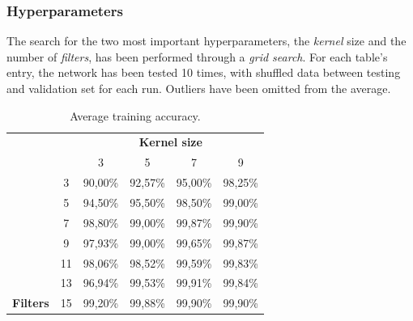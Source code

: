 \subsubsection{Hyperparameters}
The search for the two most important hyperparameters, the \textit{kernel} size and the number of \textit{filters}, has been performed through a \textit{grid search}. For each table's entry, the network has been tested 10 times, with shuffled data between testing and validation set for each run. Outliers have been omitted from the average.

\begin{table}[ht!]
	\centering
	\begin{tabular}{cccccc}
		&                                                 & \multicolumn{4}{c}{\textbf{Kernel size}} \\
		& \multicolumn{1}{c|}{}                           & 3                               & 5                               & 7                               & 9                               \\ \cline{2-6} 
		& \multicolumn{1}{c|}{3}                          & 90,00\%                         & 92,57\%                         & 95,00\%                         & 98,25\%                         \\
		& \multicolumn{1}{c|}{\cellcolor[HTML]{EFEFEF}5}  & \cellcolor[HTML]{EFEFEF}94,50\% & \cellcolor[HTML]{EFEFEF}95,50\% & \cellcolor[HTML]{EFEFEF}98,50\% & \cellcolor[HTML]{EFEFEF}99,00\% \\
		& \multicolumn{1}{c|}{7}                          & 98,80\%                         & 99,00\%                         & 99,87\%                         & 99,90\%                         \\
		& \multicolumn{1}{c|}{\cellcolor[HTML]{EFEFEF}9}  & \cellcolor[HTML]{EFEFEF}97,93\% & \cellcolor[HTML]{EFEFEF}99,00\% & \cellcolor[HTML]{EFEFEF}99,65\% & \cellcolor[HTML]{EFEFEF}99,87\% \\
		& \multicolumn{1}{c|}{11}                         & 98,06\%                         & 98,52\%                         & 99,59\%                         & 99,83\%                         \\
		& \multicolumn{1}{c|}{\cellcolor[HTML]{EFEFEF}13} & \cellcolor[HTML]{EFEFEF}96,94\% & \cellcolor[HTML]{EFEFEF}99,53\% & \cellcolor[HTML]{EFEFEF}99,91\% & \cellcolor[HTML]{EFEFEF}99,84\% \\
		\multirow{-7}{*}{\textbf{Filters}} & \multicolumn{1}{c|}{15}                         & 99,20\%                         & 99,88\%                         & 99,90\%                         & 99,90\%                        
	\end{tabular}
	\caption{Average training accuracy.}
\end{table}

